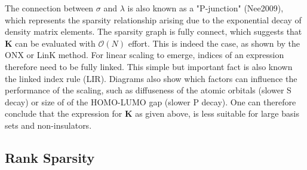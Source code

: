 \noindent The connection between $\sigma$ and $\lambda$ is also known as a "P-junction" (Nee2009), which represents the sparsity relationship arising due to the exponential decay of density matrix elements. The sparsity graph is fully connect, which suggests that $\mathbf{K}$ can be evaluated with $\mathcal{O}(N)$ effort. This is indeed the case, as shown by the ONX or LinK method. For linear scaling to emerge, indices of an expression therefore need to be fully linked. This simple but important fact is also known the linked index rule (LIR). Diagrams also show which factors can influence the performance of the scaling, such as diffuseness of the atomic orbitals (slower S decay) or size of of the HOMO-LUMO gap (slower P decay). One can therefore conclude that the expression for $\mathbf{K}$ as given above, is less suitable for large basis sets and non-insulators.

\subsection{Rank Sparsity}

